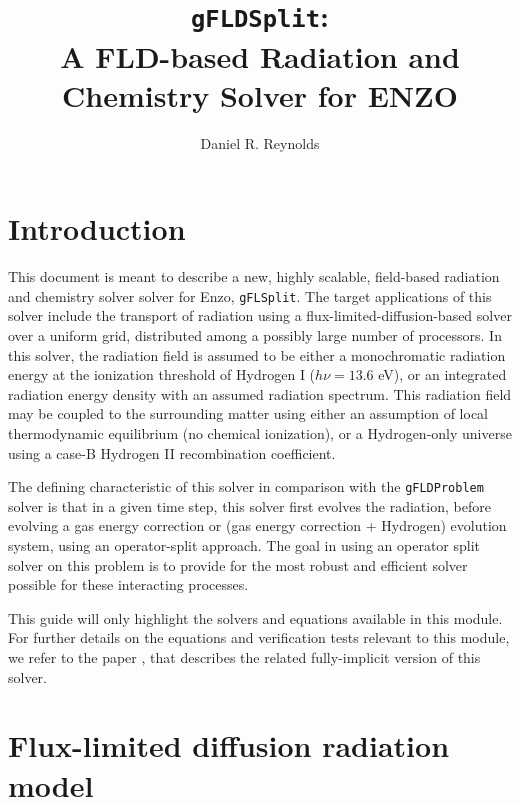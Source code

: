 \documentclass[letterpaper,10pt]{article}
\author{Daniel R. Reynolds}
\title{{\tt gFLDSplit}: \\
A FLD-based Radiation and Chemistry Solver for ENZO}
\renewcommand{\(}{\left(}
\renewcommand{\)}{\right)}
\begin{document}
\maketitle

\section{Introduction}
\label{sec:intro}

This document is meant to describe a new, highly scalable,
field-based radiation and chemistry solver solver for Enzo, 
{\tt gFLSplit}. The target applications of this solver include the
transport of radiation using a flux-limited-diffusion-based solver
over a uniform grid, distributed among a possibly large number of
processors.  In this solver, the radiation field is assumed to be
either a monochromatic radiation energy at the ionization threshold of
Hydrogen I ($h\nu = 13.6$ eV), or an integrated radiation energy
density with an assumed radiation spectrum.  This radiation field may
be coupled to the surrounding matter using either an assumption of
local thermodynamic equilibrium (no chemical ionization), or a
Hydrogen-only universe using a case-B Hydrogen II recombination
coefficient.  

The defining characteristic of this solver in comparison
with the {\tt gFLDProblem} solver is that in a given time step, this
solver first evolves the radiation, before evolving a gas energy
correction or (gas energy correction + Hydrogen) evolution system,
using an operator-split approach.  The goal in using an operator split
solver on this problem is to provide for the most robust and efficient
solver possible for these interacting processes.

This guide will only highlight the solvers and equations available in
this module.  For further details on the equations and verification
tests relevant to this module, we refer to the paper
\cite{ReynoldsHayesPaschosNorman2009}, that describes the related
fully-implicit version of this solver.




\section{Flux-limited diffusion radiation model}
\label{sec:rad_model}
\end{document}
